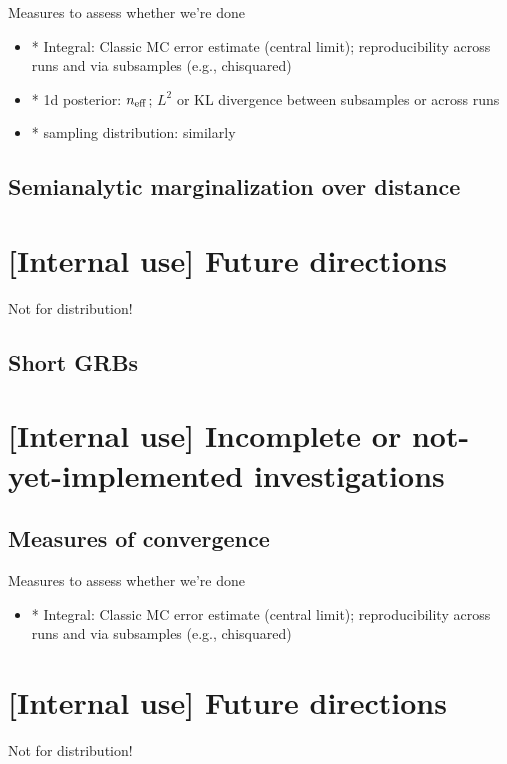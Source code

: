 Measures to assess whether we're done
\begin{itemize}
\item * Integral: Classic MC error estimate (central limit); reproducibility across runs and via subsamples (e.g., chisquared)

\item * 1d posterior:  $n_{\rm eff}$; $L^2$ or KL divergence between subsamples or across runs

\item * sampling distribution: similarly
\end{itemize}


\subsection{Semianalytic marginalization over distance}


\section{[Internal use] Future directions}

Not for distribution!

\subsection{Short GRBs}


\section{[Internal use] Incomplete or not-yet-implemented investigations}

\subsection{Measures of convergence}

Measures to assess whether we're done
\begin{itemize}
\item * Integral: Classic MC error estimate (central limit); reproducibility across runs and via subsamples (e.g., chisquared)
\end{itemize}

\section{[Internal use] Future directions}

Not for distribution!

